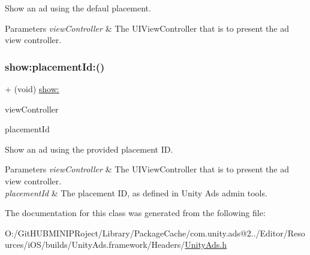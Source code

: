 Show an ad using the defaul placement.


\begin{DoxyParams}{Parameters}
{\em view\+Controller} & The {\ttfamily U\+I\+View\+Controller} that is to present the ad view controller. \\
\hline
\end{DoxyParams}
\mbox{\label{interface_unity_ads_a3b26d257b4fcc8807df6878bb0db09ea}} 
\subsubsection{\texorpdfstring{show:placementId:()}{show:placementId:()}}
{\footnotesize\ttfamily + (void) \mbox{\hyperlink{interface_unity_ads_a9246ffcfb9c831021f57cf81c21d3757}{show\+:}} \begin{DoxyParamCaption}\item[{(U\+I\+View\+Controller $\ast$)}]{view\+Controller }\item[{placement\+Id\+:(N\+S\+String $\ast$)}]{placement\+Id }\end{DoxyParamCaption}}

Show an ad using the provided placement ID.


\begin{DoxyParams}{Parameters}
{\em view\+Controller} & The {\ttfamily U\+I\+View\+Controller} that is to present the ad view controller. \\
\hline
{\em placement\+Id} & The placement ID, as defined in Unity Ads admin tools. \\
\hline
\end{DoxyParams}


The documentation for this class was generated from the following file\+:\begin{DoxyCompactItemize}
\item 
O\+:/\+Git\+H\+U\+B\+M\+I\+N\+I\+P\+Roject/\+Library/\+Package\+Cache/com.\+unity.\+ads@2../\+Editor/\+Resources/i\+O\+S/builds/\+Unity\+Ads.\+framework/\+Headers/\mbox{\hyperlink{_unity_ads_8h}{Unity\+Ads.\+h}}\end{DoxyCompactItemize}
